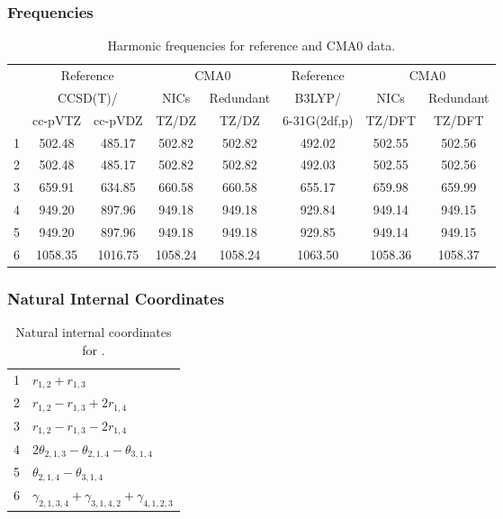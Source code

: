 \documentclass[10pt,oneside]{article}
\begin{document}
\begin{table}[h!]
\subsubsection*{Frequencies}
\centering
\caption{Harmonic frequencies for reference and CMA0 data.}
\begin{tabular}{cccccccc}
\toprule
{} & \multicolumn{2}{c}{Reference} & \multicolumn{2}{c}{CMA0} &    Reference & \multicolumn{2}{c}{CMA0} \\
{} & \multicolumn{2}{c}{CCSD(T)/} &    NICs &  Redundant &       B3LYP/ &    NICs & Redundant \\
{} &   cc-pVTZ & cc-pVDZ &   TZ/DZ &      TZ/DZ & 6-31G(2df,p) &  TZ/DFT &    TZ/DFT \\
\midrule
1 &    502.48 &  485.17 &  502.82 &     502.82 &       492.02 &  502.55 &    502.56 \\
2 &    502.48 &  485.17 &  502.82 &     502.82 &       492.03 &  502.55 &    502.56 \\
3 &    659.91 &  634.85 &  660.58 &     660.58 &       655.17 &  659.98 &    659.99 \\
4 &    949.20 &  897.96 &  949.18 &     949.18 &       929.84 &  949.14 &    949.15 \\
5 &    949.20 &  897.96 &  949.18 &     949.18 &       929.85 &  949.14 &    949.15 \\
6 &   1058.35 & 1016.75 & 1058.24 &    1058.24 &      1063.50 & 1058.36 &   1058.37 \\
\bottomrule
\end{tabular}
\end{table}

\begin{table}[h!]
\subsubsection*{Natural Internal Coordinates}
\centering
\caption{Natural internal coordinates for .}
\small
\begin{tabular}{ll}
\toprule
  1   & $r_{1,2} + r_{1,3}$ \\
  2   & $r_{1,2} - r_{1,3} + 2r_{1,4}$ \\
  3   & $r_{1,2} - r_{1,3} - 2r_{1,4}$ \\
  4   & $2\theta_{2,1,3} - \theta_{2,1,4} - \theta_{3,1,4}$ \\
  5   & $\theta_{2,1,4} - \theta_{3,1,4}$ \\
  6   & $\gamma_{2,1,3,4} + \gamma_{3,1,4,2} + \gamma_{4,1,2,3}$ \\
\bottomrule
\end{tabular}
\end{table}
\end{document}

